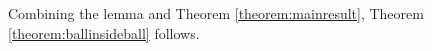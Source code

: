 \documentclass[a4paper,11pt]{article}
\theoremstyle{definition}
\newcommand{\ep}{\epsilon}
\begin{document}
Combining the lemma and Theorem \ref{theorem:mainresult}, Theorem \ref{theorem:ballinsideball} follows.






\end{document}
